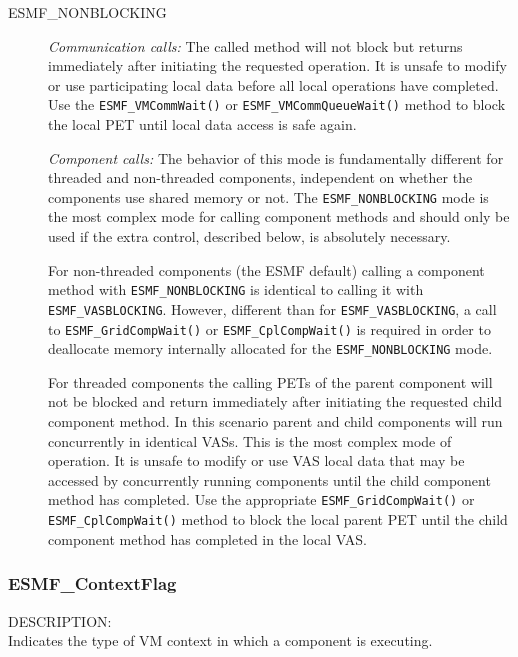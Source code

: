 \begin{description}
\item [ESMF\_NONBLOCKING]
         {\em Communication calls:} The called method will not block but 
         returns immediately after initiating the requested operation. It is
         unsafe to modify or use participating local data before all local
         operations have completed. Use the {\tt ESMF\_VMCommWait()} or
         {\tt ESMF\_VMCommQueueWait()} method to block the local PET until
         local data access is safe again. 

         {\em Component calls:} The behavior of this mode is fundamentally
         different for threaded and non-threaded components,
         independent on whether the components use shared memory or not.
         The {\tt ESMF\_NONBLOCKING} mode is the most complex mode for
         calling component methods and should only be used if the extra
         control, described below, is absolutely necessary.
         
         For non-threaded components (the ESMF default)
         calling a component method with {\tt ESMF\_NONBLOCKING}
         is identical to calling it with {\tt ESMF\_VASBLOCKING}. However,
         different than for {\tt ESMF\_VASBLOCKING}, a call to
         {\tt ESMF\_GridCompWait()} or {\tt ESMF\_CplCompWait()} is
         required in order to deallocate memory internally allocated for the
         {\tt ESMF\_NONBLOCKING} mode.
         
         For threaded components the calling PETs
         of the parent component will not be blocked and return immediately
         after initiating the requested child component method. In this
         scenario parent and child components will run concurrently in
         identical VASs. This is the most complex mode of operation.
         It is unsafe to modify or use VAS local data that
         may be accessed by concurrently running components until the child
         component method has completed. Use the appropriate
         {\tt ESMF\_GridCompWait()} or {\tt ESMF\_CplCompWait()} method to
         block the local parent PET until the child component method has
         completed in the local VAS.
         

\end{description}

\subsubsection{ESMF\_ContextFlag}
\label{opt:contextflag}
{\sf DESCRIPTION:\\}  
Indicates the type of VM context in which a component is executing.

